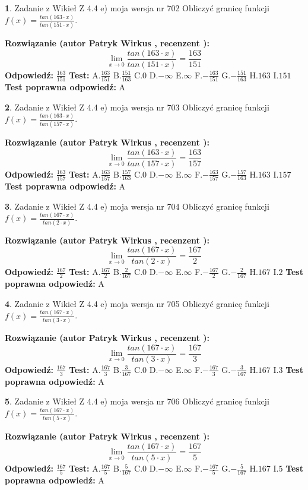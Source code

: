 \documentclass[12pt, a4paper]{article}
\theoremstyle{definition} %
\newtheorem{zad}{}
\newcommand{\zadStart}[1]{\begin{zad}#1\newline}
\newcommand{\zadStop}{\end{zad}}
\newcommand{\rozwStart}[2]{\noindent \textbf{Rozwiązanie (autor #1 , recenzent #2): }\newline}
\newcommand{\rozwStop}{\newline}
\newcommand{\odpStart}{\noindent \textbf{Odpowiedź:}\newline}
\newcommand{\odpStop}{\newline}
\newcommand{\testStart}{\noindent \textbf{Test:}\newline}
\newcommand{\testStop}{\newline}
\newcommand{\kluczStart}{\noindent \textbf{Test poprawna odpowiedź:}\newline}
\newcommand{\kluczStop}{\newline}
\begin{document}
\zadStart{Zadanie z Wikieł Z 4.4 e) moja wersja nr 702}
Obliczyć granicę funkcji $f(x)=\frac{tan(163\cdot x)}{tan(151\cdot x)}$.
\zadStop
\rozwStart{Patryk Wirkus}{}
$$\lim\limits_{x\to 0}\frac{tan(163\cdot x)}{tan(151\cdot x)}=
\frac{163}{151}$$
\rozwStop
\odpStart
$\frac{163}{151}$
\odpStop
\testStart
A.$\frac{163}{151}$
B.$\frac{151}{163}$
C.$0$
D.$-\infty$
E.$\infty$
F.$-\frac{163}{151}$
G.$-\frac{151}{163}$
H.$163$
I.$151$
\testStop
\kluczStart
A
\kluczStop



\zadStart{Zadanie z Wikieł Z 4.4 e) moja wersja nr 703}
Obliczyć granicę funkcji $f(x)=\frac{tan(163\cdot x)}{tan(157\cdot x)}$.
\zadStop
\rozwStart{Patryk Wirkus}{}
$$\lim\limits_{x\to 0}\frac{tan(163\cdot x)}{tan(157\cdot x)}=
\frac{163}{157}$$
\rozwStop
\odpStart
$\frac{163}{157}$
\odpStop
\testStart
A.$\frac{163}{157}$
B.$\frac{157}{163}$
C.$0$
D.$-\infty$
E.$\infty$
F.$-\frac{163}{157}$
G.$-\frac{157}{163}$
H.$163$
I.$157$
\testStop
\kluczStart
A
\kluczStop



\zadStart{Zadanie z Wikieł Z 4.4 e) moja wersja nr 704}
Obliczyć granicę funkcji $f(x)=\frac{tan(167\cdot x)}{tan(2\cdot x)}$.
\zadStop
\rozwStart{Patryk Wirkus}{}
$$\lim\limits_{x\to 0}\frac{tan(167\cdot x)}{tan(2\cdot x)}=
\frac{167}{2}$$
\rozwStop
\odpStart
$\frac{167}{2}$
\odpStop
\testStart
A.$\frac{167}{2}$
B.$\frac{2}{167}$
C.$0$
D.$-\infty$
E.$\infty$
F.$-\frac{167}{2}$
G.$-\frac{2}{167}$
H.$167$
I.$2$
\testStop
\kluczStart
A
\kluczStop



\zadStart{Zadanie z Wikieł Z 4.4 e) moja wersja nr 705}
Obliczyć granicę funkcji $f(x)=\frac{tan(167\cdot x)}{tan(3\cdot x)}$.
\zadStop
\rozwStart{Patryk Wirkus}{}
$$\lim\limits_{x\to 0}\frac{tan(167\cdot x)}{tan(3\cdot x)}=
\frac{167}{3}$$
\rozwStop
\odpStart
$\frac{167}{3}$
\odpStop
\testStart
A.$\frac{167}{3}$
B.$\frac{3}{167}$
C.$0$
D.$-\infty$
E.$\infty$
F.$-\frac{167}{3}$
G.$-\frac{3}{167}$
H.$167$
I.$3$
\testStop
\kluczStart
A
\kluczStop



\zadStart{Zadanie z Wikieł Z 4.4 e) moja wersja nr 706}
Obliczyć granicę funkcji $f(x)=\frac{tan(167\cdot x)}{tan(5\cdot x)}$.
\zadStop
\rozwStart{Patryk Wirkus}{}
$$\lim\limits_{x\to 0}\frac{tan(167\cdot x)}{tan(5\cdot x)}=
\frac{167}{5}$$
\rozwStop
\odpStart
$\frac{167}{5}$
\odpStop
\testStart
A.$\frac{167}{5}$
B.$\frac{5}{167}$
C.$0$
D.$-\infty$
E.$\infty$
F.$-\frac{167}{5}$
G.$-\frac{5}{167}$
H.$167$
I.$5$
\testStop
\kluczStart
A
\kluczStop
\end{document}
